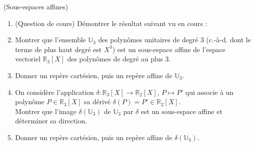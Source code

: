 \documentclass[a4paper,12pt,reqno]{amsart}
\begin{document}
\begin{exo} (Sous-espaces affines)

  \begin{enumerate}
    \item (Question de cours) Démontrer le résultat suivant vu en cours :

    \vspace{7pt}
    \vspace{7pt}

    \item Montrer que l'ensemble $\mathbb{U}_{3}$ des polynômes unitaires de degré 3 (c.-à-d. dont le terme de plus haut degré est $X^{3}$) est un sous-espace affine de l'espace vectoriel $\mathbb{R}_{3}[X]$ des polynômes de degré au plus 3.

    \item Donner un repère cartésien, puis un repère affine de $\mathbb{U}_{3}$.

    \item On considère l'application $\delta:\mathbb{R}_{3}[X] \rightarrow \mathbb{R}_{2}[X]$, $P \mapsto P'$ qui associe à un polynôme $P \in \mathbb{R}_{3}[X]$ sa dérivé $\delta(P)=P' \in \mathbb{R}_{2}[X]$.\\
    Montrer que l'image $\delta(\mathbb{U}_{3})$ de $\mathbb{U}_{3}$ par $\delta$ est un sous-espace affine et déterminer sa direction.

    \item Donner un repère cartésien, puis un repère affine de $\delta(\mathbb{U}_{3})$.
   \end{enumerate}

\end{exo}
\end{document}
